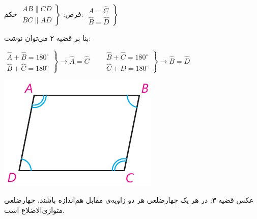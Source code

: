 \documentclass[12pt, a4paper]{book}
\begin{document}
\begin{minipage}{.75\textwidth}
	 فرض: 
	$\left.
	\begin{array}{rrr}
		AB \parallel CD \\
		BC \parallel AD
	\end{array}
	\right\}$
	\hfill حکم:
	$ \left. 
	\begin{array}{rrr}
		\widehat{A} = \widehat{C} \\
		\widehat{B} = \widehat{D}
	\end{array}
 \right\}$
 \begin{flushright}
 	 بنا بر قضیه ۲ می‌توان نوشت:
 \end{flushright}
	\begin{flushleft}
		$ \left.
		\begin{array}{rrr} 
			\widehat{A} + \widehat{B} = 180^{\circ} \\
			\widehat{B} + \widehat{C} = 180^{\circ}
		\end{array}
	 \right\}
	 \rightarrow \widehat{A} = \widehat{C}
	 \qquad
	  \left.
	  \begin{array}{rrr} 
	  	\widehat{B} + \widehat{C} = 180^{\circ} \\
	  	\widehat{C} + \widehat{D} = 180^{\circ}
	  \end{array}
	  \right\}
	  \rightarrow \widehat{B} = \widehat{D}$
	\end{flushleft}
\end{minipage}
\begin{minipage}{.25\textwidth}
	\begin{flushleft}
		\includegraphics[scale=0.8]{"Shapes/Fasl - 3/Dars 1/qazie 3.pdf"}
	\end{flushleft}
\end{minipage}

{\semibold عکس قضیه ۳}: در هر یک چهارضلعی هر دو زاویه‌ی مقابل هم‌اندازه باشند، چهارضلعی متوازی‌الاضلاع است.
\end{document}

